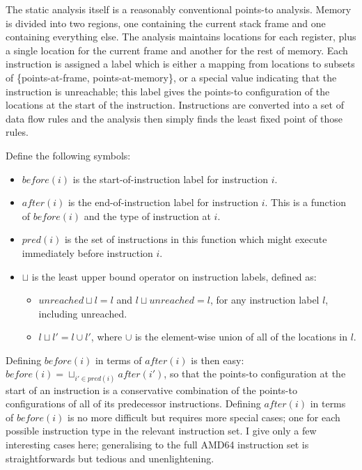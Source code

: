The static analysis itself is a reasonably conventional points-to
analysis.  Memory is divided into two regions, one containing the
current stack frame and one containing everything else.  The analysis
maintains locations for each register, plus a single location for the
current frame and another for the rest of memory.  Each instruction is
assigned a label which is either a mapping from locations to subsets
of \{points-at-frame, points-at-memory\}, or a special value
indicating that the instruction is unreachable; this label gives the
points-to configuration of the locations at the start of the
instruction.  Instructions are converted into a set of data flow rules
and the analysis then simply finds the least fixed point of those
rules.

Define the following symbols:

\begin{itemize}
\item $before(i)$ is the start-of-instruction label for instruction
  $i$.
\item $after(i)$ is the end-of-instruction label for instruction $i$.
  This is a function of $before(i)$ and the type of instruction at
  $i$.
\item $pred(i)$ is the set of instructions in this function which
  might execute immediately before instruction $i$.
\item $\sqcup$ is the least upper bound operator on instruction
  labels, defined as:

  \begin{itemize}
  \item $unreached {\sqcup} l = l$ and $l {\sqcup} unreached = l$, for
    any instruction label $l$, including unreached.
  \item $l {\sqcup} l' = l \cup l'$, where $\cup$ is the element-wise
    union of all of the locations in $l$.
  \end{itemize}
\end{itemize}

Defining $before(i)$ in terms of $after(i)$ is then easy: $before(i) =
\sqcup_{i' \in pred(i)}after(i')$, so that the points-to configuration
at the start of an instruction is a conservative combination of the
points-to configurations of all of its predecessor instructions.
Defining $after(i)$ in terms of $before(i)$ is no more difficult but
requires more special cases; one for each possible instruction type in
the relevant instruction set.  I give only a few interesting cases
here; generalising to the full AMD64 instruction set is
straightforwards but tedious and unenlightening.

